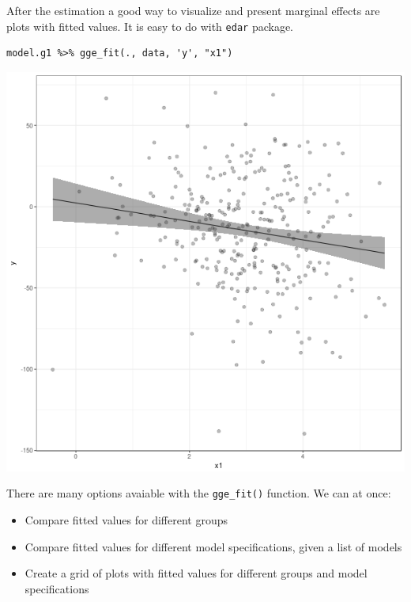 \documentclass[a4paper]{article}
\begin{document}
After the estimation a good way to visualize and present marginal effects are plots with fitted values. It is easy to do with \texttt{edar} package.

\lstset{numbers=left,language=r,label= ,caption= ,captionpos=b}
\begin{lstlisting}
model.g1 %>% gge_fit(., data, 'y', "x1")
\end{lstlisting}

\begin{center}
\includegraphics[width=.9\linewidth]{fig-fitted-value-1.png}
\end{center}

There are many options avaiable with the \texttt{gge\_fit()} function. We can at once:
\begin{itemize}
\item Compare fitted values for different groups
\item Compare fitted values for different model specifications, given a list of models
\item Create a grid of plots with fitted values for different groups and model specifications
\end{itemize}
\end{document}
